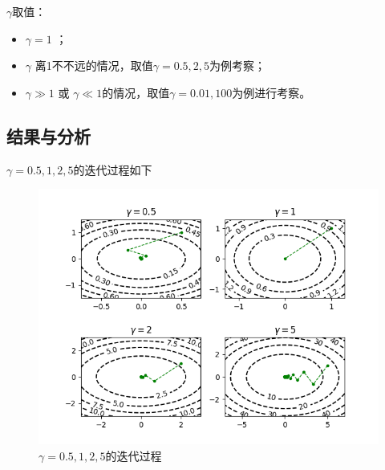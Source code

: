 \documentclass{article}
\begin{document}
$\gamma$取值：
\begin{itemize}
    \item $\gamma =1$ ；
    \item $\gamma$ 离1不不远的情况，取值$\gamma=0.5,2,5$为例考察；
    \item $\gamma \gg 1$ 或 $\gamma \ll 1$的情况，取值$\gamma=0.01,100$为例进行考察。
\end{itemize}

\subsection{结果与分析}

$\gamma=0.5,1,2,5$的迭代过程如下
\begin{figure}[H]
    \centering
    \includegraphics[scale=0.8]{Fig/3-34.png}
    \caption{$\gamma=0.5,1,2,5$的迭代过程}
\end{figure}
\end{document}
